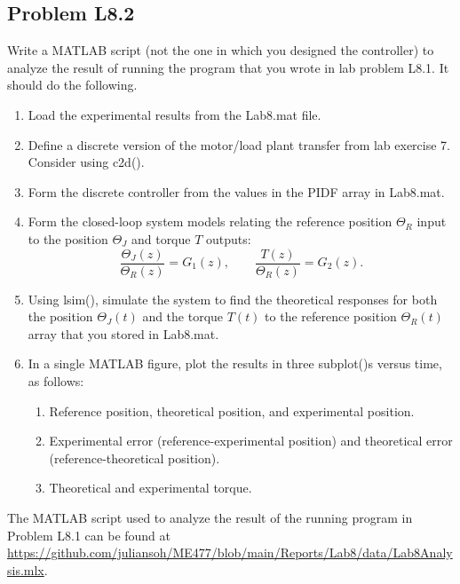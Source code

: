\documentclass[10pt,twocolumn]{article}
\begin{document}
\subsection{Problem L8.2}
Write a MATLAB script (not the one in which you designed
the controller) to analyze the result of running the program that you wrote in lab
problem L8.1. It should do the following.
\begin{enumerate}
\item Load the experimental results from the Lab8.mat file.
\item Define a discrete version of the motor/load plant transfer from lab exercise 7.
Consider using c2d().
\item Form the discrete controller from the values in the PIDF array in Lab8.mat.
\item Form the closed-loop system models relating the reference position $\Theta_R$ input to
the position $\Theta_J$ and torque $T$ outputs:
\[
\frac{\Theta_J(z)}{\Theta_R(z)} = G_1(z), \qquad \frac{T(z)}{\Theta_R(z)} = G_2(z).
\]
\item Using lsim(), simulate the system to find the theoretical responses for both the
position $\Theta_J(t)$ and the torque $T(t)$ to the reference position $\Theta_R(t)$ array that you
stored in Lab8.mat.
\item In a single MATLAB figure, plot the results in three subplot()s versus time, as
follows:
\begin{enumerate}
\item Reference position, theoretical position, and experimental position.
\item Experimental error (reference-experimental position) and theoretical
error (reference-theoretical position).
\item Theoretical and experimental torque.
\end{enumerate}
\end{enumerate}

\vspace{\baselineskip}

The MATLAB script used to analyze the result of the running program in Problem L8.1 can be found at \url{https://github.com/juliansoh/ME477/blob/main/Reports/Lab8/data/Lab8Analysis.mlx}.
\end{document}
